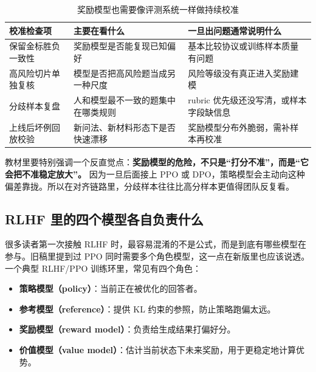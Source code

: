 \begin{table}[H]
\centering
\small
\begin{tabularx}{\textwidth}{>{\raggedright\arraybackslash}p{2.8cm}>{\raggedright\arraybackslash}p{3cm}>{\raggedright\arraybackslash}X}
\toprule
\textbf{校准检查项} & \textbf{主要在看什么} & \textbf{一旦出问题通常说明什么} \\
\midrule
保留金标胜负一致性 & 奖励模型是否能复现已知偏好 & 基本比较协议或训练样本质量有问题 \\
高风险切片单独复核 & 模型是否把高风险题当成另一种尺度 & 风险等级没有真正进入奖励建模 \\
分歧样本复盘 & 人和模型最不一致的题集中在哪类规则 & rubric 优先级还没写清，或样本字段缺信息 \\
上线后坏例回放校验 & 新问法、新材料形态下是否快速漂移 & 奖励模型分布外脆弱，需补样本再校准 \\
\bottomrule
\end{tabularx}
\caption{奖励模型也需要像评测系统一样做持续校准}
\label{tab:reward-model-calibration}
\end{table}

教材里要特别强调一个反直觉点：\textbf{奖励模型的危险，不只是“打分不准”，而是“它会把不准稳定放大”。} 因为一旦后面接上 PPO 或 DPO，策略模型会主动向这种偏差靠拢。所以在对齐链路里，分歧样本往往比高分样本更值得团队反复看。

\subsection{RLHF 里的四个模型各自负责什么}
很多读者第一次接触 RLHF 时，最容易混淆的不是公式，而是到底有哪些模型在参与。旧稿里提到过 PPO 同时需要多个角色模型，这一点在新版里也应该说透。一个典型 RLHF/PPO 训练环里，常见有四个角色：
\begin{itemize}
  \item \textbf{策略模型（policy）}：当前正在被优化的回答者。
  \item \textbf{参考模型（reference）}：提供 KL 约束的参照，防止策略跑偏太远。
  \item \textbf{奖励模型（reward model）}：负责给生成结果打偏好分。
  \item \textbf{价值模型（value model）}：估计当前状态下未来奖励，用于更稳定地计算优势。
\end{itemize}

